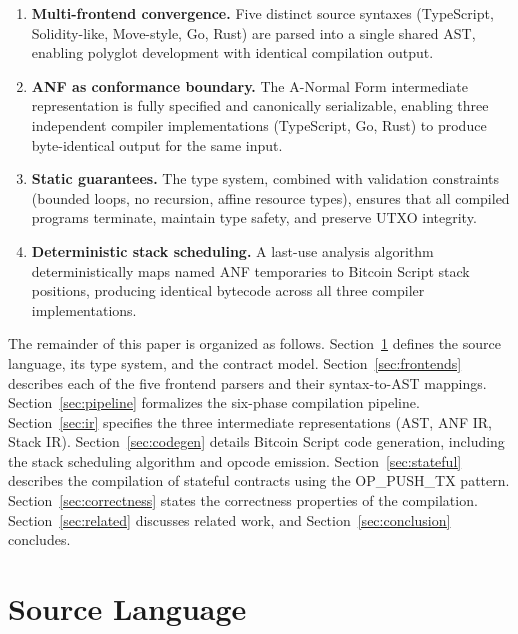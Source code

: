 \documentclass[11pt,a4paper]{article}
\begin{document}
\begin{enumerate}[label=(\roman*)]
  \item \textbf{Multi-frontend convergence.} Five distinct source syntaxes
    (TypeScript, Solidity-like, Move-style, Go, Rust) are parsed into a
    single shared AST, enabling polyglot development with identical
    compilation output.
  \item \textbf{ANF as conformance boundary.} The A-Normal Form intermediate
    representation is fully specified and canonically serializable, enabling
    three independent compiler implementations (TypeScript, Go, Rust) to
    produce byte-identical output for the same input.
  \item \textbf{Static guarantees.} The type system, combined with validation
    constraints (bounded loops, no recursion, affine resource types), ensures
    that all compiled programs terminate, maintain type safety, and preserve
    UTXO integrity.
  \item \textbf{Deterministic stack scheduling.} A last-use analysis algorithm
    deterministically maps named ANF temporaries to Bitcoin Script stack
    positions, producing identical bytecode across all three compiler
    implementations.
\end{enumerate}

The remainder of this paper is organized as follows. Section~\ref{sec:language}
defines the source language, its type system, and the contract model.
Section~\ref{sec:frontends} describes each of the five frontend parsers and
their syntax-to-AST mappings. Section~\ref{sec:pipeline} formalizes the
six-phase compilation pipeline. Section~\ref{sec:ir} specifies the three
intermediate representations (AST, ANF IR, Stack IR).
Section~\ref{sec:codegen} details Bitcoin Script code generation, including
the stack scheduling algorithm and opcode emission.
Section~\ref{sec:stateful} describes the compilation of stateful contracts
using the OP\_PUSH\_TX pattern. Section~\ref{sec:correctness} states the
correctness properties of the compilation. Section~\ref{sec:related}
discusses related work, and Section~\ref{sec:conclusion} concludes.

\section{Source Language}
\label{sec:language}
\end{document}
